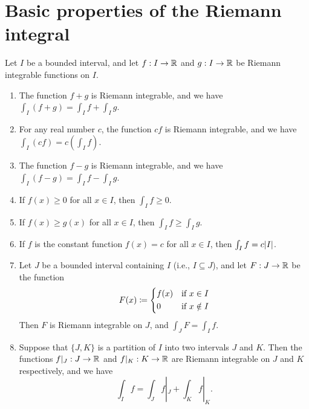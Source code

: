 \section{Basic properties of the Riemann integral}\label{sec:11.4}

\begin{thm}\label{11.4.1}
  Let \(I\) be a bounded interval, and let \(f : I \to \mathbb{R}\) and \(g : I \to \mathbb{R}\) be Riemann integrable functions on \(I\).
  \begin{enumerate}
    \item The function \(f + g\) is Riemann integrable, and we have \(\int_I (f + g) = \int_I f + \int_I g\).
    \item For any real number \(c\), the function \(cf\) is Riemann integrable, and we have \(\int_I (cf) = c(\int_I f)\).
    \item The function \(f - g\) is Riemann integrable, and we have \(\int_I (f - g) = \int_I f - \int_I g\).
    \item If \(f(x) \geq 0\) for all \(x \in I\), then \(\int_I f \geq 0\).
    \item If \(f(x) \geq g(x)\) for all \(x \in I\), then \(\int_I f \geq \int_I g\).
    \item If \(f\) is the constant function \(f(x) = c\) for all \(x \in I\), then \(\int_I f = c \abs{I}\).
    \item Let \(J\) be a bounded interval containing \(I\) (i.e., \(I \subseteq J\)), and let \(F : J \to \mathbb{R}\) be the function
          \[
            F(x) \coloneqq \begin{dcases}
              f(x) & \text{if } x \in I    \\
              0    & \text{if } x \notin I \\
            \end{dcases}
          \]
          Then \(F\) is Riemann integrable on \(J\), and \(\int_J F = \int_I f\).
    \item Suppose that \(\{J, K\}\) is a partition of \(I\) into two intervals \(J\) and \(K\).
          Then the functions \(f|_J : J \to \mathbb{R}\) and \(f|_K : K \to \mathbb{R}\) are Riemann integrable on \(J\) and \(K\) respectively, and we have
          \[
            \int_I f = \int_J f|_J + \int_K f|_K.
          \]
  \end{enumerate}
\end{thm}

